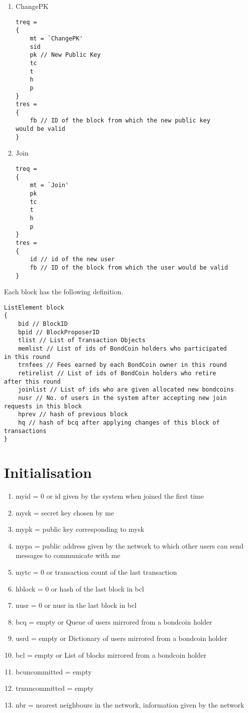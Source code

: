 {\begin{enumerate}
\begin{enumerate}
        \item ChangePK
        \begin{verbatim}
treq = 
{
    mt = `ChangePK'
    sid
    pk // New Public Key
    tc
    t
    h
    p
}
tres =
{
    fb // ID of the block from which the new public key 
would be valid
}    
        \end{verbatim}
        \item Join
        \begin{verbatim}
treq = 
{
    mt = `Join'
    pk
    tc
    t
    h
    p
}
tres =
{
    id // id of the new user
    fb // ID of the block from which the user would be valid
}
        \end{verbatim}
    \end{enumerate}
Each block has the following definition.
\begin{verbatim}
ListElement block
{
    bid // BlockID
    bpid // BlockProposerID
    tlist // List of Transaction Objects
    memlist // List of ids of BondCoin holders who participated 
in this round
    trnfees // Fees earned by each BondCoin owner in this round
    retirelist // List of ids of BondCoin holders who retire 
after this round
    joinlist // List of ids who are given allocated new bondcoins
    nusr // No. of users in the system after accepting new join 
requests in this block
    hprev // hash of previous block
    hq // hash of bcq after applying changes of this block of 
transactions
}    
\end{verbatim}
\end{enumerate}
}

\section{Initialisation}
{
\singlespacing
\begin{enumerate}
    \item myid = 0 or id given by the system when joined the first time
	\item mysk = secret key chosen by me
	\item mypk = public key corresponding to mysk
	\item mypa = public address given by the network to which other users can send messages to communicate with me
	\item mytc = 0 or transaction count of the last transaction
	\item hblock = 0 or hash of the last block in bcl
	\item nusr = 0 or nusr in the last block in bcl
	\item bcq = empty or Queue of users mirrored from a bondcoin holder
	\item usrd = empty or Dictionary of users mirrored from a bondcoin holder
	\item bcl = empty or List of blocks mirrored from a bondcoin holder
	\item bcuncommitted = empty
	\item trnuncommitted = empty
	\item nbr = nearest neighbours in the network, information given by the network
\end{enumerate}
}

